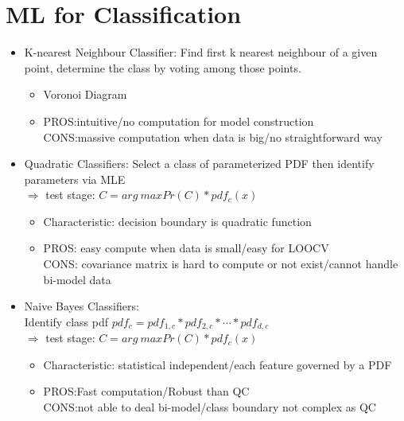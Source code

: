 \documentclass[12pt,a4paper,draft]{article}
\begin{document}
\section{ML for Classification}
\begin{itemize}
\item K-nearest Neighbour Classifier: Find first k nearest neighbour of a given point, determine the class by voting among those points.
\begin{itemize}
\item Voronoi Diagram
\item PROS:intuitive/no computation for model construction \\ CONS:massive computation when data is big/no straightforward way 
\end{itemize} 
\item Quadratic Classifiers: Select a class of parameterized PDF then identify parameters via MLE\\
$\Rightarrow$ test stage: $C = arg\ maxPr(C)*pdf_c(x)$
\begin{itemize}
\item Characteristic: decision boundary is quadratic function
\item PROS: easy compute when data is small/easy for LOOCV\\
CONS: covariance matrix is hard to compute or not exist/cannot handle bi-model data
\end{itemize}
\item Naive Bayes Classifiers:\\Identify class pdf $pdf_c = pdf_{1,c}*pdf_{2,c}*\cdots*pdf_{d,c}$\\
$\Rightarrow$ test stage: $C = arg\ maxPr(C)*pdf_c(x)$
\begin{itemize}
\item Characteristic: statistical independent/each feature governed by a PDF
\item PROS:Fast computation/Robust than QC\\
CONS:not able to deal bi-model/class boundary not complex as QC
\end{itemize}


\end{itemize}
\end{document}

